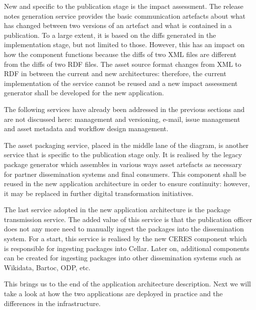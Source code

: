 	New and specific to the publication stage is the impact assessment. The release notes generation service provides the basic communication artefacts about what has changed between two versions of an artefact and what is contained in a publication. To a large extent, it is based on the diffs generated in the implementation stage, but not limited to those. However, this has an impact on how the component functions because the diffs of two XML files are different from the diffs of two RDF files. The asset source format changes from XML to RDF in between the current and new architectures: therefore, the current implementation of the service cannot be reused and a new impact assessment generator shall be developed for the new application. 

	The following services have already been addressed in the previous sections and are not discussed here: management and versioning, e-mail, issue management and asset metadata and workflow design management. 
	
	The asset packaging service, placed in the middle lane of the diagram, is another service that is specific to the publication stage only. It is realised by the legacy package generator which assembles in various ways asset artefacts as necessary for partner dissemination systems and final consumers. This component shall be reused in the new application architecture in order to ensure continuity: however, it may be replaced in further digital transformation initiatives. 
	
	The last service adopted in the new application architecture is the package transmission service. The added value of this service is that the publication officer does not any more need to manually ingest the packages into the dissemination system. For a start, this service is realised by the new CERES component which is responsible for ingesting packages into Cellar. Later on, additional components can be created for ingesting packages into other dissemination systems such as Wikidata, Bartoc, ODP, etc. 
	
	This brings us to the end of the application architecture description. Next we will take a look at how the two applications are deployed in practice and the differences in the infrastructure.